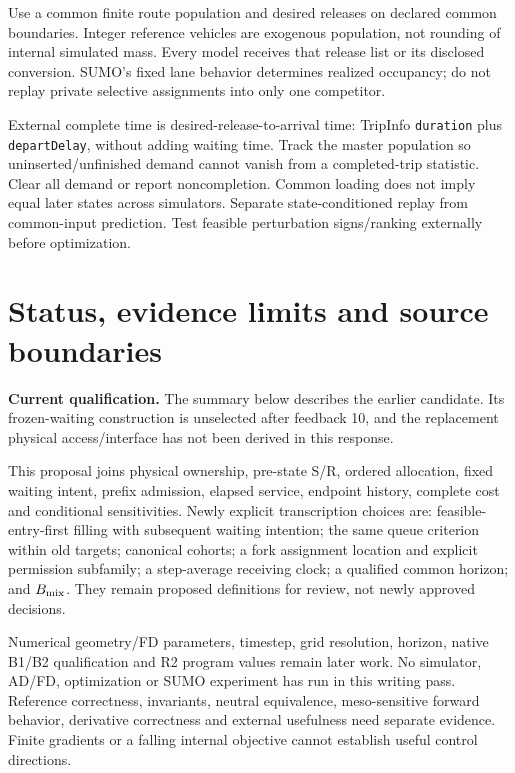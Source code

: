 \documentclass[10pt,a4paper]{article}
\begin{document}
Use a common finite route population and desired releases on declared
common boundaries. Integer reference vehicles are exogenous population,
not rounding of internal simulated mass. Every model receives that release
list or its disclosed conversion. SUMO's fixed lane behavior determines
realized occupancy; do not replay private selective assignments into only
one competitor.

External complete time is desired-release-to-arrival time: TripInfo
\texttt{duration} plus \texttt{departDelay}, without adding waiting time.
Track the master population so uninserted/unfinished demand cannot vanish
from a completed-trip statistic. Clear all demand or report noncompletion.
Common loading does not imply equal later states across simulators.
Separate state-conditioned replay from common-input prediction.
Test feasible perturbation signs/ranking externally before optimization.

\section{Status, evidence limits and source boundaries}

\textbf{Current qualification.}
The summary below describes the earlier candidate. Its frozen-waiting
construction is unselected after feedback 10, and the replacement physical
access/interface has not been derived in this response.


This proposal joins physical ownership, pre-state S/R, ordered allocation,
fixed waiting intent, prefix admission, elapsed service, endpoint history,
complete cost and conditional sensitivities. Newly explicit transcription
choices are: feasible-entry-first filling with subsequent waiting intention;
the same queue criterion within old targets; canonical cohorts; a
fork assignment location and explicit permission subfamily; a step-average
receiving clock; a qualified common horizon; and $B_{\rm mix}$.
They remain proposed definitions for review, not newly approved decisions.

Numerical geometry/FD parameters, timestep, grid resolution, horizon,
native B1/B2 qualification and R2 program values remain later work. No
simulator, AD/FD, optimization or SUMO experiment has run in this writing
pass. Reference correctness, invariants, neutral equivalence, meso-sensitive
forward behavior, derivative correctness and external usefulness need
separate evidence. Finite gradients or a falling internal objective cannot
establish useful control directions.
\end{document}
